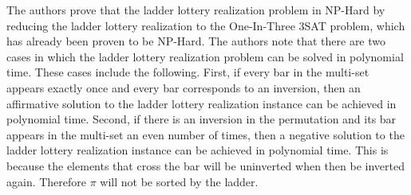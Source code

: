 \pagebreak
The authors prove that the ladder lottery realization problem in NP-Hard
by reducing the ladder lottery realization to the One-In-Three 3SAT problem, 
which has already been proven to be NP-Hard.
The authors note that there are two cases in which the ladder lottery
realization problem can be solved in polynomial time. These cases 
include the following. First, if every bar in the multi-set appears
exactly once and every bar corresponds to an inversion, 
then an affirmative solution to the ladder lottery realization 
instance can be achieved in polynomial time. 
Second, if there is an inversion in the permutation and its bar appears in the multi-set an even 
number of times, then a negative solution to
the ladder lottery realization instance
can be achieved in polynomial time. This is because the elements that cross the bar will 
be uninverted when then be inverted again. Therefore $\pi$ will not be sorted by the ladder.\par